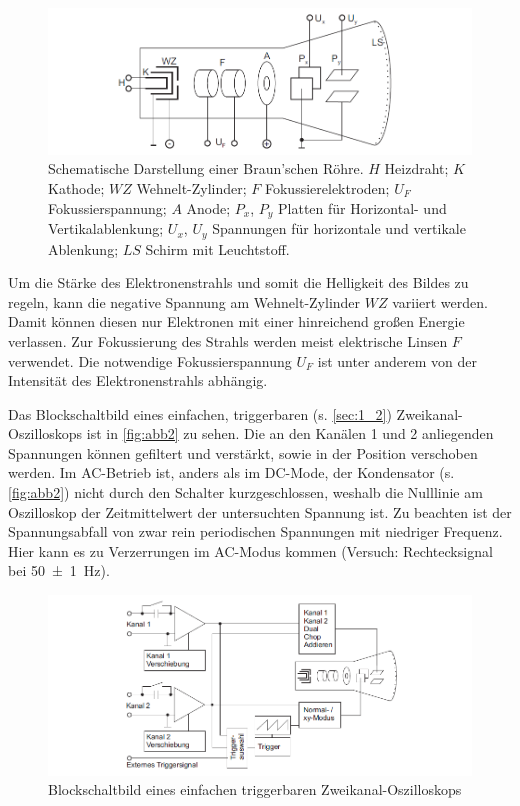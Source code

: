 \documentclass[11pt,ngerman]{scrartcl}
\begin{document}
\begin{figure}[H]
	\begin{center}
		\includegraphics[width=\textwidth]{abb1}
	\end{center}
	\caption{Schematische Darstellung einer Braun’schen Röhre. $H$ Heizdraht; $K$ Kathode; $WZ$
		Wehnelt-Zylinder; $F$ Fokussierelektroden; $U_F$ Fokussierspannung; $A$ Anode; $P_x$, $P_y$ Platten für
		Horizontal- und Vertikalablenkung; $U_x$, $U_y$ Spannungen für horizontale und vertikale Ablenkung;
		$LS$ Schirm mit Leuchtstoff.}
	\label{fig:abb1}
\end{figure}

Um die Stärke des Elektronenstrahls und somit die Helligkeit des Bildes zu regeln, kann die
negative Spannung am Wehnelt-Zylinder $WZ$ variiert werden. Damit können diesen nur Elektronen
mit einer hinreichend großen Energie verlassen. Zur Fokussierung des Strahls werden
meist elektrische Linsen $F$ verwendet. Die notwendige Fokussierspannung $U_F$ ist unter anderem
von der Intensität des Elektronenstrahls abhängig.

Das Blockschaltbild eines einfachen, triggerbaren (s. \autoref{sec:1_2}) Zweikanal-Oszilloskops ist in
\autoref{fig:abb2} zu sehen. Die an den Kanälen 1 und 2 anliegenden Spannungen können gefiltert und
verstärkt, sowie in der Position verschoben werden. Im AC-Betrieb ist, anders als im DC-Mode,
der Kondensator (s. \autoref{fig:abb2}) nicht durch den Schalter kurzgeschlossen, weshalb die Nulllinie am
Oszilloskop der Zeitmittelwert der untersuchten Spannung ist. Zu beachten ist der Spannungsabfall von
zwar rein periodischen Spannungen mit niedriger Frequenz. Hier kann es zu Verzerrungen im
AC-Modus kommen (Versuch: Rechtecksignal bei \SI{50(1)}{\hertz}).

\begin{figure}[H]
	\begin{center}
		\includegraphics[width=\textwidth]{abb2}
	\end{center}
	\caption{Blockschaltbild eines einfachen triggerbaren Zweikanal-Oszilloskops}
	\label{fig:abb2}
\end{figure}
\end{document}
